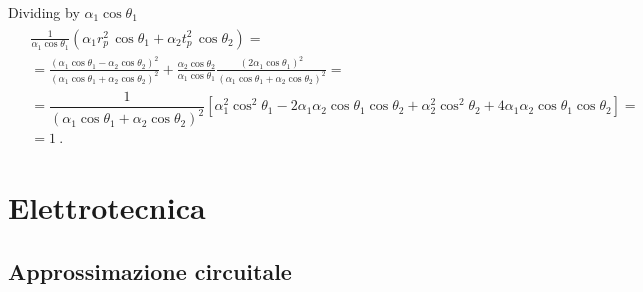 \documentclass[letterpaper,10pt,italian]{jupyterBook}
\begin{document}
\sphinxAtStartPar
Dividing by \(\alpha_1 \cos  \theta_1\)
\begin{equation*}
\begin{split}\begin{aligned}
 & \frac{1}{\alpha_1 \cos \theta_1} \left( \alpha_1 r_p^2 \, \cos \theta_1 + \alpha_2 t_p^2 \, \cos \theta_2 \right) = \\
 & = \frac{\left(\alpha_1 \cos \theta_1 - \alpha_2 \cos \theta_2\right)^2}{\left(\alpha_1 \cos \theta_1 + \alpha_2 \cos \theta_2\right)^2} + \frac{\alpha_2 \cos \theta_2}{\alpha_1 \cos \theta_1} \frac{\left( 2 \alpha_1 \cos \theta_1 \right)^2}{\left( \alpha_1 \cos \theta_1 + \alpha_2 \cos \theta_2 \right)^2} = \\
  & = \dfrac{1}{\left( \alpha_1 \cos \theta_1 + \alpha_2 \cos \theta_2 \right)^2} \left[ \alpha_1^2 \cos^2 \theta_1 - 2 \alpha_1 \alpha_2 \cos \theta_1 \cos \theta_2 + \alpha_2^2 \cos^2 \theta_2 + 4 \alpha_1 \alpha_2 \cos \theta_1 \cos \theta_2 \right] = \\
  & = 1 \ .
\end{aligned}\end{split}
\end{equation*}
\sphinxstepscope


\part{Elettrotecnica}

\sphinxstepscope




\chapter{Approssimazione circuitale}
\label{\detokenize{ch/circuits:approssimazione-circuitale}}\label{\detokenize{ch/circuits:classical-electromagnetism-circuits}}\label{\detokenize{ch/circuits::doc}}
\sphinxAtStartPar
{} 

\sphinxAtStartPar
{} 

\sphinxAtStartPar
{} 
\end{document}
